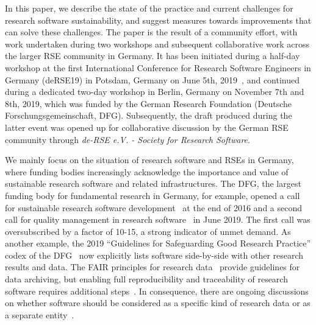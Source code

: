 \documentclass[a4paper,num-refs,numbers,sort&compress]{de-rse}
\begin{document}
In this paper, we describe the state of the practice and current challenges for research software sustainability, and suggest measures towards improvements that can solve these challenges.
The paper is the result of a community effort, with work undertaken during two workshops and subsequent collaborative work across the larger RSE community in Germany.
It has been initiated during a half-day workshop at the first International Conference for Research Software Engineers in Germany (deRSE19) in Potsdam, Germany on June 5th, 2019~\cite{deRSEconf}, and continued during a dedicated two-day workshop in Berlin, Germany on November 7th and 8th, 2019, which was funded by the German Research Foundation (Deutsche Forschungsgemeinschaft, DFG).
Subsequently, the draft produced during the latter event was opened up for collaborative discussion by the German RSE community through \textit{de-RSE e.V. - Society for Research Software}.

We mainly focus on the situation of research software and RSEs in Germany, where funding bodies increasingly acknowledge the importance and value of sustainable research software and related infrastructures.
The DFG, the largest funding body for fundamental research in Germany, for example, opened a call for sustainable research software development~\cite{DFGcall1} at the end of 2016 and a second call for quality management in research software~\cite{DFGcall2} in June 2019. The first call was oversubscribed by a factor of 10-15, a strong indicator of unmet demand. As another example, the 2019 ``Guidelines for Safeguarding Good Research Practice'' codex of the DFG~\cite{DFGcode} now explicitly lists software side-by-side with other research results and data. The FAIR principles for research data~\cite{Wilkinson2016} provide guidelines for data archiving, but enabling full reproducibility and traceability of research software requires additional steps~\cite{hasselbring2019fair}. In consequence, there are ongoing discussions on whether software should be considered as a specific kind of research data or as a separate entity~\cite{lamprechttowards}.
\end{document}
